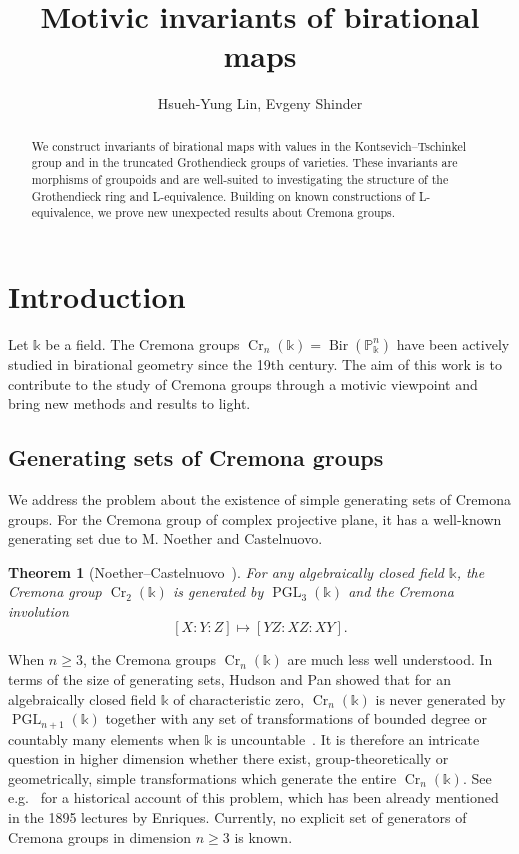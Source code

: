 \documentclass[a4paper,12pt]{amsart}
\title{Motivic invariants of birational maps}
\author{Hsueh-Yung Lin, Evgeny Shinder}
\def\k{\mathbb k}
\def\P{\mathbb P}
\def\PGL{{\operatorname{PGL}}}
\def\Bir{{\operatorname{Bir}}}
\def\Cr{{\operatorname{Cr}}}
\theoremstyle{plain}
\newtheorem{theorem}[dummy]{Theorem}
\numberwithin{equation}{section}
\theoremstyle{definition}
\newcommand{\ssec}{\subsection}
\renewcommand{\(}{\left(}
\renewcommand{\)}{\right)}
\begin{document}
\raggedbottom

\maketitle

\begin{abstract}
We construct invariants of birational maps 
with values in the Kontsevich--Tschinkel group
and in the truncated Grothendieck groups of varieties.
These invariants are morphisms of groupoids and are
well-suited 
to investigating the structure
of the Grothendieck ring and L-equivalence.
Building on
known constructions
of L-equivalence, we prove new unexpected
results about
Cremona groups.
\end{abstract}

\setcounter{tocdepth}{1}
\tableofcontents 

\section{Introduction}

Let $\k$ be a field.
The Cremona groups $\Cr_n(\k) = \Bir(\P^n_{\k})$
have been actively studied in birational geometry since
the 19th century.
The aim of this work is to contribute to the study of Cremona groups
through a motivic viewpoint 
and bring new methods and results to light.

\ssec{Generating sets of Cremona groups}
\hfill 


We address the problem
about the existence of simple generating sets of Cremona groups.
For the Cremona group of complex projective plane,
it has a well-known generating set due to
M. Noether and Castelnuovo.


\begin{theorem}[Noether--Castelnuovo~{\cite{zbMATH02722071,CastelnuovoCr2}}]\label{thm:noether}
For any algebraically closed field $\k$,
the Cremona group $\Cr_2(\k)$ is generated by $\PGL_3(\k)$
and the Cremona involution 
\[[X:Y:Z] \mapsto [YZ:XZ:XY].\]
\end{theorem}

When $n \ge 3$, the Cremona groups $\Cr_n(\k)$ 
are much less well understood. 
In terms of the size of generating sets, Hudson and Pan showed that 
for an algebraically closed field $\k$ of characteristic zero,
$\Cr_n(\k)$ is never generated by $\PGL_{n+1}(\k)$
together with any set of transformations of bounded degree 
or countably many elements
when $\k$ is uncountable~\cite{HudsonPan}.
It is therefore an intricate
question in higher dimension whether there exist,
group-theoretically or geometrically,
simple transformations
which generate the entire $\Cr_n(\k)$.
See e.g.~\cite[1.C]{BLZ} for a historical account of this problem,
which has been already mentioned in the 1895 
lectures by Enriques.
Currently, no explicit set of generators
of Cremona groups in dimension $n \ge 3$ is known.
\end{document}
